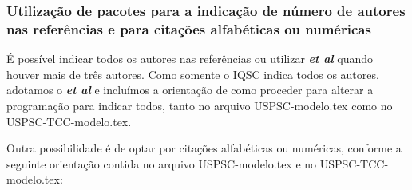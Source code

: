 \subsubsection{Utilização de pacotes para a indicação de número de autores nas refer\^encias e para citações alfab\'eticas ou num\'ericas}
É possível indicar todos os autores nas refer\^encias ou utilizar \textbf{\textit{et al}} quando houver mais de tr\^es autores. Como somente o IQSC indica todos os autores, adotamos o \textbf{\textit{et al}} e incluímos a orientação de como proceder para alterar a programação para indicar todos, tanto no arquivo USPSC-modelo.tex como no USPSC-TCC-modelo.tex.

Outra possibilidade \'e de optar por citações alfab\'eticas ou num\'ericas, conforme a seguinte orientação contida no arquivo USPSC-modelo.tex e no USPSC-TCC-modelo.tex:	
		  
